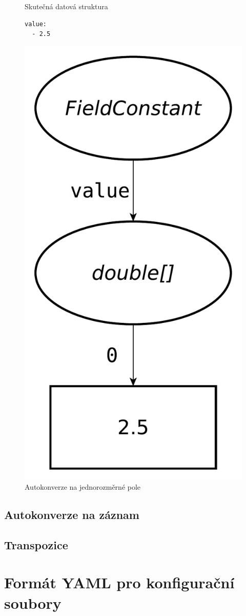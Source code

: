 \documentclass[FM,bw,DP]{tulthesis}
\begin{document}
\begin{figure}[ht]
\begin{minipage}[t]{0.45\linewidth}
\end{minipage}
\begin{minipage}[t]{0.45\linewidth}
\vspace{0pt}
Skutečná datová struktura\\
\vspace{-5pt}
\begin{lstlisting}
value:
  - 2.5
\end{lstlisting}
\vspace*{-20pt}
\begin{center}
\includegraphics[width=.5\textwidth]{../img/autoconversion_array_1_after.pdf}
\end{center}
\end{minipage}
\caption{Autokonverze na jednorozměrné pole}
\end{figure}	

\subsection{Autokonverze na záznam}
\label{sec:autokonverze-zaznam}

\subsection{Transpozice}


\section{Formát YAML pro konfigurační soubory}
\end{document}

